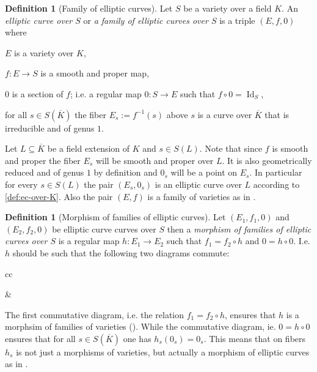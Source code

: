\documentclass[a4paper,12pt,reqno]{amsart}
\DeclareMathOperator{\id}{Id}
\theoremstyle{definition}
\newtheorem{definition}[lemma]{Definition}
\numberwithin{lemma}{section}
\numberwithin{equation}{section}
\numberwithin{figure}{section}
\begin{document}
\begin{definition}[Family of elliptic curves]\label{def:ec-over-var}
Let $S$ be a variety over a field $K$. An \textit{elliptic curve over $S$} or \textit{a family of elliptic curves over $S$} is a triple $(E,f,0)$ where
\begin{defenum}
	\item $E$ is a variety over $K$,
	\item $f : E \to S$ is a smooth and proper map,
	\item $0$ is a section of $f$; i.e.  a regular map $0: S \to E$ such that $f \circ 0 = \id_S$,
	\item for all $s \in S(\overline K)$ the fiber $E_{s} := f^{-1}(s)$ above $s$ is a curve over $\overline K$ that is irreducible  and of genus $1$.
\end{defenum}
\end{definition}



Let $L \subseteq \overline K$ be a field extension of $K$ and $s \in S(L)$. Note that since $f$ is smooth and proper the fiber $E_s$ will be smooth and proper over $L$. It is also geometrically reduced and of genus $1$ by definition and $0_s$ will be a point on $E_s$. In particular for every  $s \in S(L)$ the pair $(E_s,0_s)$ is an elliptic curve over $L$ according to \cref{def:ec-over-K}. Also the pair $(E,f)$ is a family of varieties as in .

\begin{definition}[Morphism of families of elliptic curves]
Let $(E_1,f_1,0)$ and $(E_2,f_2,0)$ be elliptic curve curves over $S$ then a \textit{morphism of families of elliptic curves over $S$} is a regular map $h : E_1 \to E_2$ such that $f_1 = f_2\circ h$ and $0 = h \circ 0$.
I.e. $h$ should be such that the following two diagrams commute:
\begin{center}


\begin{tabular}{cc}	
	&
\end{tabular}
\end{center}

The first commutative diagram, i.e. the relation $f_1 = f_2\circ h$, ensures that $h$ is a morphsim of families of varieties (). While the commutative diagram, ie. $0 = h \circ 0$ ensures that for all $s \in S(\overline K)$ one has $h_s(0_s) = 0_s$.  This means that on fibers $h_s$ is not just a morphisms of varieties, but actually a morphism of elliptic curves as in .

\end{definition}
\end{document}
